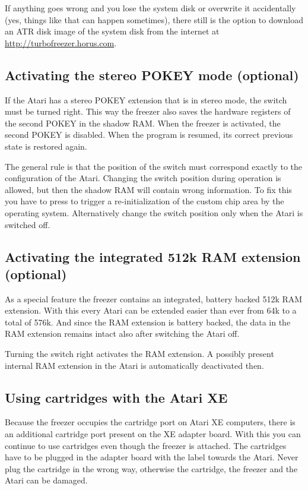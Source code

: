 If anything goes wrong and you lose the system disk or overwrite it
accidentally (yes, things like that can happen sometimes), there still is the
option to download an ATR disk image of the system disk from the internet at
\url{http://turbofreezer.horus.com}.

\subsection{Activating the stereo POKEY mode (optional)}

If the Atari has a stereo POKEY extension that is in stereo mode, the
 switch must be turned right. This way the freezer also saves the
hardware registers of the second POKEY in the shadow RAM. When the freezer is
activated, the second POKEY is disabled. When the program is resumed, its
correct previous state is restored again.

The general rule is that the position of the switch must correspond exactly to
the configuration of the Atari. Changing the switch position during operation is
allowed, but then the shadow RAM will contain wrong information. To fix this you
have to press  to trigger a re-initialization of the custom chip
area by the operating system. Alternatively change the switch position only when the
Atari is switched off.

\subsection{Activating the integrated 512k RAM extension (optional)}

As a special feature the freezer contains an integrated, battery backed 512k RAM
extension. With this every Atari can be extended easier than ever from 64k to a
total of 576k. And since the RAM extension is battery backed, the data in the
RAM extension remains intact also after switching the Atari off.

Turning the  switch right activates the RAM extension. A possibly
present internal RAM extension in the Atari is automatically deactivated then.

\subsection{Using cartridges with the Atari XE}

Because the freezer occupies the cartridge port on Atari XE computers, there is
an additional cartridge port present on the XE adapter board. With this you can
continue to use cartridges even though the freezer is attached. The cartridges
have to be plugged in the adapter board with the label towards the Atari. Never
plug the cartridge in the wrong way, otherwise the cartridge, the freezer and
the Atari can be damaged.

